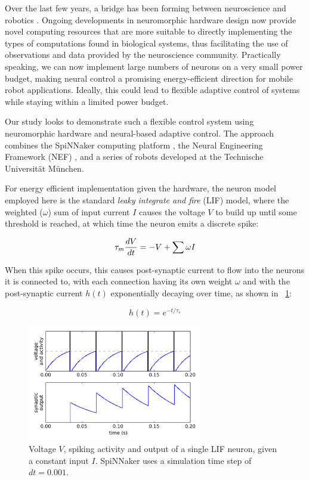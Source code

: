 \documentclass[conference]{IEEEtran}
\begin{document}
Over the last few years, a bridge has been forming between neuroscience and 
robotics \cite{krichmar2011}. Ongoing developments in neuromorphic hardware 
design now provide novel computing resources that are more suitable to
directly implementing the types of computations found in biological systems, 
thus facilitating the use of observations and data provided by the 
neuroscience community. Practically speaking, we can now implement large numbers of 
neurons on a very small power budget, making neural control a promising 
energy-efficient direction for mobile robot applications.  Ideally, this could
lead to flexible adaptive control of systems while staying within a limited
power budget.

Our study looks to demonstrate such a flexible control system using 
neuromorphic hardware and neural-based adaptive control. The approach 
combines the SpiNNaker computing 
platform \cite{furber2007neural, furber2014spinnaker}, the Neural Engineering 
Framework (NEF)  \cite{eliasmith2004neural}, and a series of robots developed at 
the Technische Universit{\"a}t M{\"u}nchen. 


For energy efficient implementation given the hardware, the neuron model
employed here is the standard \textit{leaky integrate and fire} (LIF) model, 
where the weighted ($\omega$) sum of input current $I$ causes the voltage $V$ to build up until some
threshold is reached, at which time the neuron emits a discrete spike:

\begin{equation}
    \tau_m {dV \over dt} = -V + \sum \omega I
\end{equation}

When this spike occurs, this causes post-synaptic current to flow into the 
neurons it is connected to, with each connection having its own weight $\omega$
and with the post-synaptic current $h(t)$ exponentially decaying over time, 
as shown in \figurename~\ref{Neuron}:

\begin{equation}
    h(t) = e^{-t/\tau_s}
\end{equation}

\begin{figure}[!t]
\centering
\includegraphics[width=3in]{neuron.png}
\caption{Voltage $V$, spiking activity and output of a single LIF neuron, given a constant input $I$.
SpiNNaker uses a simulation time step of $dt=0.001$.}
\label{Neuron}
\end{figure}
\end{document}
